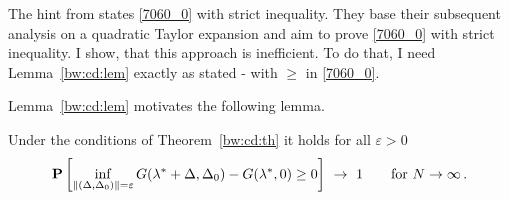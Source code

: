 \begin{remark}
  The hint from \cite[page 22]{Wang2019}
  states
  \eqref{7060_0}
  with strict inequality.
  They base their subsequent analysis on a quadratic Taylor expansion and aim to prove \eqref{7060_0} with strict inequality.
  I show, that this approach is inefficient.  
  To do that, I need Lemma~\ref{bw:cd:lem} exactly as stated - with $\ge$ in \eqref{7060_0}.
\end{remark}
Lemma~\ref{bw:cd:lem} motivates the following lemma.
 \begin{lemma}
   \label{bw:cd:lem2}
   Under the conditions of Theorem~\ref{bw:cd:th} it holds
   for all $\varepsilon>0$
\begin{gather}
   \P
   \left[ 
     \inf _ { 
       \norm{
         (
     \Delta
     ,
     \Delta_0
         )
 } 
= \varepsilon }
     G
     (
     \lambda^*
      +
      \Delta
      ,
     \Delta_0
     )
     -
     G
     (
     \lambda^*,
     0
     )
     \ge 
     0
   \right]
   \ 
   \to
   \ 
   1
   \qquad
   \text{for}
   \ 
   N\to\infty
   \,.
\end{gather}
 \end{lemma}

